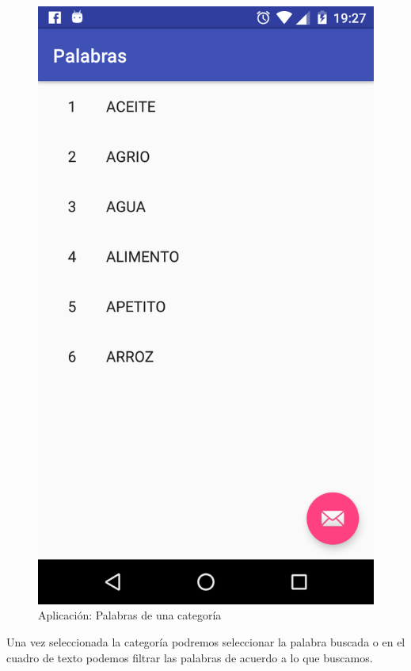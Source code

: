 \begin{figure}[H]
	\centering
	\includegraphics[scale = 0.2]{figures/app10}
	\caption{Aplicación: Palabras de una categoría}
	\label{fig:app10}
\end{figure}

Una vez seleccionada la categoría podremos seleccionar la palabra buscada o en el cuadro de texto podemos filtrar las palabras de acuerdo a lo que buscamos.


